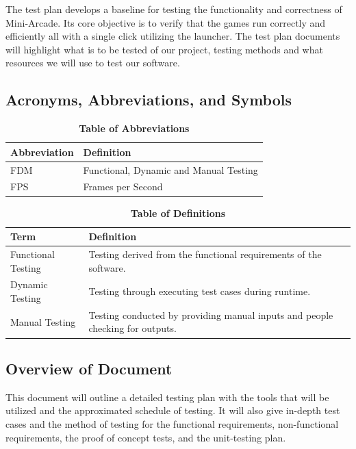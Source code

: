 \documentclass[12pt, titlepage]{article}
\begin{document}
The test plan develops a baseline for testing the functionality and correctness of Mini-Arcade. Its core objective is to verify that the games run correctly and efficiently all with a single click utilizing the launcher. The test plan documents will highlight what is to be tested of our project, testing methods and what resources we will use to test our software.

\subsection{Acronyms, Abbreviations, and Symbols}
	
\begin{table}[hbp]
\caption{\textbf{Table of Abbreviations}} \label{Abbrev}

\begin{tabularx}{\textwidth}{p{3.5cm}X}
\toprule
\textbf{Abbreviation} & \textbf{Definition} \\
\midrule
FDM & Functional, Dynamic and Manual Testing\\
FPS & Frames per Second\\
\bottomrule
\end{tabularx}

\end{table}

\begin{table}[!htbp]
\caption{\textbf{Table of Definitions}} \label{Defs}

\begin{tabularx}{\textwidth}{p{3.5cm}X}
\toprule
\textbf{Term} & \textbf{Definition}\\
\midrule
Functional Testing & Testing derived from the functional requirements of the software.\\
Dynamic Testing & Testing through executing test cases during runtime.\\
Manual Testing & Testing conducted by providing manual inputs and people checking for outputs.\\
\bottomrule
\end{tabularx}

\end{table}	

\subsection{Overview of Document}

This document will outline a detailed testing plan with the tools that will be utilized and the approximated schedule of testing. It will also give in-depth test cases and the method of testing for the functional requirements, non-functional requirements, the proof of concept tests, and the unit-testing plan.
\end{document}

